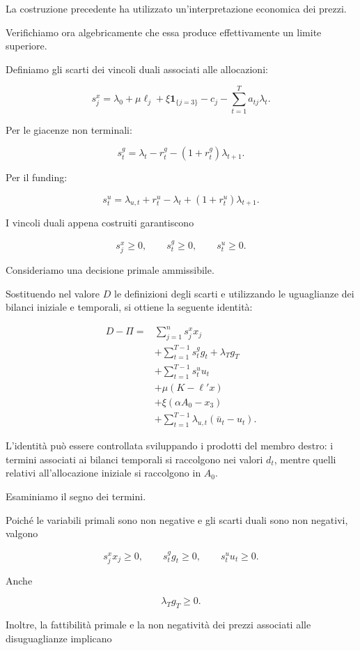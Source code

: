 La costruzione precedente ha utilizzato
un'interpretazione economica dei prezzi.

Verifichiamo ora algebricamente che essa
produce effettivamente un limite superiore.

Definiamo gli scarti dei vincoli duali
associati alle allocazioni:

\[
s_j^x
=
\lambda_0+\mu\ell_j
+\xi\mathbf{1}_{\{j=3\}}
-c_j-\sum_{t=1}^{T}a_{tj}\lambda_t.
\]

Per le giacenze non terminali:

\[
s_t^g
=
\lambda_t-r_t^g
-(1+r_t^g)\lambda_{t+1}.
\]

Per il funding:

\[
s_t^u
=
\lambda_{u,t}+r_t^u-\lambda_t
+(1+r_t^u)\lambda_{t+1}.
\]

I vincoli duali appena costruiti garantiscono

\[
s_j^x\geq0,\qquad
s_t^g\geq0,\qquad
s_t^u\geq0.
\]

Consideriamo una decisione primale ammissibile.

Sostituendo nel valore $D$ le definizioni
degli scarti e utilizzando le uguaglianze
dei bilanci iniziale e temporali, si ottiene
la seguente identit\`{a}:

\[
\begin{aligned}
D-\Pi
={}&
\sum_{j=1}^{n}s_j^x x_j\\
&+\sum_{t=1}^{T-1}s_t^g g_t
+\lambda_Tg_T\\
&+\sum_{t=1}^{T-1}s_t^u u_t\\
&+\mu(K-\ell'x)\\
&+\xi(\alpha A_0-x_3)\\
&+\sum_{t=1}^{T-1}
\lambda_{u,t}(\bar u_t-u_t).
\end{aligned}
\]

L'identit\`{a} pu\`{o} essere controllata
sviluppando i prodotti del membro destro:
i termini associati ai bilanci temporali
si raccolgono nei valori $d_t$, mentre
quelli relativi all'allocazione iniziale
si raccolgono in $A_0$.

Esaminiamo il segno dei termini.

Poich\'{e} le variabili primali sono
non negative e gli scarti duali sono
non negativi, valgono

\[
s_j^xx_j\geq0,\qquad
s_t^gg_t\geq0,\qquad
s_t^uu_t\geq0.
\]

Anche

\[
\lambda_Tg_T\geq0.
\]

Inoltre, la fattibilit\`{a} primale
e la non negativit\`{a} dei prezzi
associati alle disuguaglianze implicano

